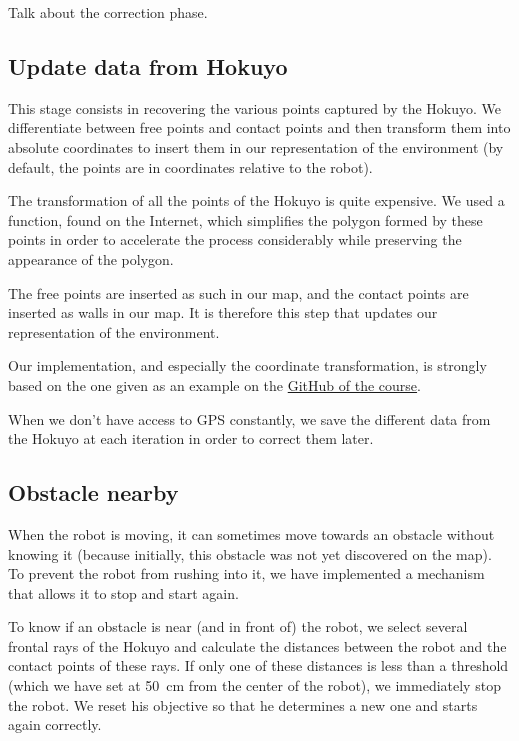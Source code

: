 \documentclass[a4paper, 10pt, conference]{ieeeconf}
\begin{document}
    Talk about the correction phase.
    
    \subsection{Update data from Hokuyo}
    
    This stage consists in recovering the various points captured by the Hokuyo. We differentiate between free points and contact points and then transform them into absolute coordinates to insert them in our representation of the environment (by default, the points are in coordinates relative to the robot).
    
    The transformation of all the points of the Hokuyo is quite expensive. We used a function, found on the Internet, which simplifies the polygon formed by these points in order to accelerate the process considerably while preserving the appearance of the polygon.
    
    The free points are inserted as such in our map, and the contact points are inserted as walls in our map. It is therefore this step that updates our representation of the environment.
    
    Our implementation, and especially the coordinate transformation, is strongly based on the one given as an example on the \href{https://github.com/ULgRobotics/trs}{GitHub of the course}.
    
    When we don't have access to GPS constantly, we save the different data from the Hokuyo at each iteration in order to correct them later.
    
    \subsection{Obstacle nearby}
    
    When the robot is moving, it can sometimes move towards an obstacle without knowing it (because initially, this obstacle was not yet discovered on the map). To prevent the robot from rushing into it, we have implemented a mechanism that allows it to stop and start again.
    
    To know if an obstacle is near (and in front of) the robot, we select several frontal rays of the Hokuyo and calculate the distances between the robot and the contact points of these rays. If only one of these distances is less than a threshold (which we have set at \SI{50}{\centi\meter} from the center of the robot), we immediately stop the robot. We reset his objective so that he determines a new one and starts again correctly.
    
\end{document}
